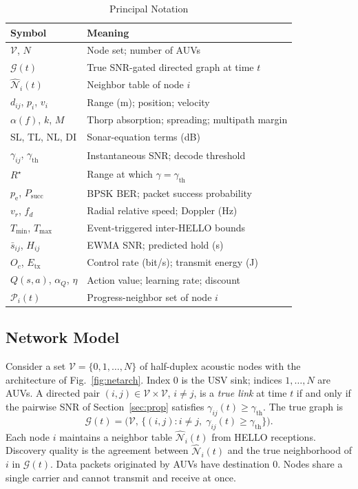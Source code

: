 \documentclass[journal]{IEEEtran}
\begin{document}
\begin{table}[!t]
\caption{Principal Notation}
\label{tab:notation}
\centering
\setlength{\tabcolsep}{3.5pt}
\begin{tabular}{ll}
\toprule
Symbol & Meaning \\
\midrule
$\mathcal{V}$, $N$ & Node set; number of AUVs \\
$\mathcal{G}(t)$ & True SNR-gated directed graph at time $t$ \\
$\widehat{\mathcal{N}}_i(t)$ & Neighbor table of node $i$ \\
$d_{ij}$, $p_i$, $v_i$ & Range (m); position; velocity \\
$\alpha(f)$, $k$, $M$ & Thorp absorption; spreading; multipath margin \\
$\mathrm{SL}$, $\mathrm{TL}$, $\mathrm{NL}$, $\mathrm{DI}$ & Sonar-equation terms (dB) \\
$\gamma_{ij}$, $\gamma_{\mathrm{th}}$ & Instantaneous SNR; decode threshold \\
$R^{\star}$ & Range at which $\gamma=\gamma_{\mathrm{th}}$ \\
$p_{\mathrm{e}}$, $P_{\mathrm{succ}}$ & BPSK BER; packet success probability \\
$v_r$, $f_d$ & Radial relative speed; Doppler (Hz) \\
$T_{\min}$, $T_{\max}$ & Event-triggered inter-HELLO bounds \\
$\bar{s}_{ij}$, $H_{ij}$ & EWMA SNR; predicted hold (s) \\
$O_c$, $E_{\mathrm{tx}}$ & Control rate (bit/s); transmit energy (J) \\
$Q(s,a)$, $\alpha_Q$, $\eta$ & Action value; learning rate; discount \\
$\mathcal{P}_i(t)$ & Progress-neighbor set of node $i$ \\
\bottomrule
\end{tabular}
\end{table}

\subsection{Network Model}
Consider a set $\mathcal{V}=\{0,1,\ldots,N\}$ of half-duplex acoustic
nodes with the architecture of Fig.~\ref{fig:netarch}.
Index $0$ is the USV sink; indices $1,\ldots,N$ are AUVs.
A directed pair $(i,j)\in\mathcal{V}\times\mathcal{V}$, $i\neq j$,
is a \emph{true link} at time $t$ if and only if the pairwise SNR
of Section~\ref{sec:prop} satisfies
$\gamma_{ij}(t)\ge\gamma_{\mathrm{th}}$.
The true graph is
\begin{equation}
\mathcal{G}(t)=\bigl(\mathcal{V},\,\bigl\{(i,j):i\neq j,\;\gamma_{ij}(t)\ge\gamma_{\mathrm{th}}\bigr\}\bigr).
\label{eq:graph}
\end{equation}
Each node $i$ maintains a neighbor table $\widehat{\mathcal{N}}_i(t)$
from HELLO receptions. Discovery quality is the agreement between
$\widehat{\mathcal{N}}_i(t)$ and the true neighborhood of $i$ in
$\mathcal{G}(t)$. Data packets originated by AUVs have destination $0$.
Nodes share a single carrier and cannot transmit and receive at once.
\end{document}
